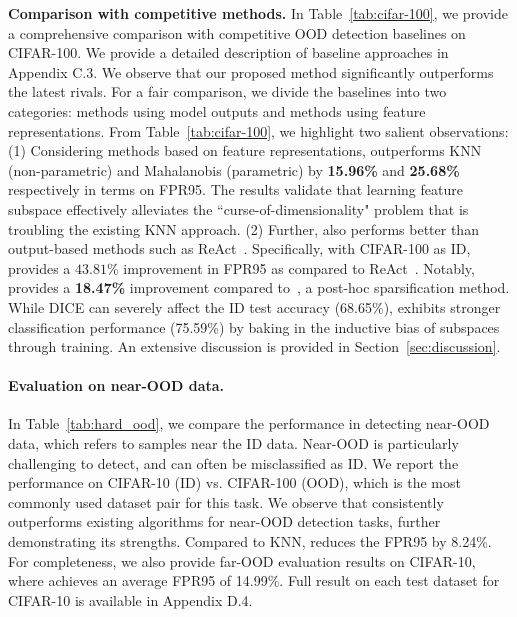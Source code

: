 \vspace{0.2cm}
\noindent \textbf{Comparison with competitive methods.} In Table~\ref{tab:cifar-100}, we provide a comprehensive comparison with competitive OOD detection baselines on  CIFAR-100. {We provide a detailed description of baseline approaches in Appendix C.3.} We observe that our proposed method \name significantly outperforms the latest rivals. For a fair comparison, we divide the baselines into two categories: methods using model outputs and methods using feature representations.
From Table~\ref{tab:cifar-100}, we highlight two salient observations: (1) Considering methods based on feature representations, \name outperforms KNN (non-parametric) and Mahalanobis (parametric) by \textbf{15.96\%} and \textbf{25.68\%} respectively in terms on FPR95. The results validate that learning feature subspace effectively alleviates the ``curse-of-dimensionality" problem that is troubling the existing KNN approach. (2) Further, \name also performs better than output-based methods such as ReAct~\cite{sun2021react}. Specifically, with CIFAR-100 as ID, \name provides a $\mathbf{43.81}\%$ improvement in FPR95 as compared to ReAct~\cite{sun2021react}. Notably, \name provides a \textbf{18.47\%} improvement compared to~\cite{sun2022dice}, a post-hoc sparsification method. While DICE can severely affect the ID test accuracy (68.65\%), \name exhibits stronger classification performance (75.59\%) by baking in the inductive bias of subspaces through training. An extensive discussion is provided in Section~\ref{sec:discussion}. 



\paragraph{Evaluation on near-OOD data.} In Table~\ref{tab:hard_ood}, we compare the performance in detecting near-OOD data, which refers to samples near the ID data. Near-OOD is particularly challenging to detect, and can often be misclassified as ID. We report the performance on CIFAR-10 (ID) vs. CIFAR-100 (OOD), which is the most commonly used dataset pair for this task. We observe that \name consistently outperforms existing algorithms for near-OOD detection tasks, further demonstrating its strengths. Compared to KNN, \name reduces the FPR95 by 8.24\%. For completeness, we also provide far-OOD evaluation results on CIFAR-10, where \name achieves an average FPR95 of 14.99\%. Full result on each test dataset for CIFAR-10 is available in Appendix D.4.



